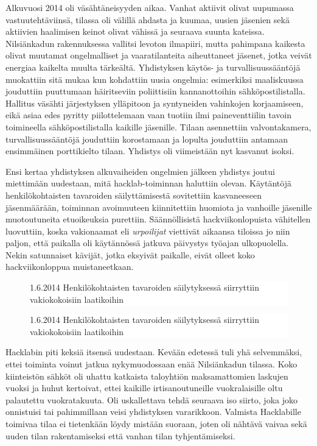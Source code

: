 \documentclass[a4paper]{memoir}
\newcommand{\varitys}{white}
\newlength{\aXa}
\newlength{\aXb}
\newcommand{\jana}[1]{
        \setlength{\aXa}{4cm}
        \setlength{\aXb}{0.4\textwidth}
   \ifodd\value{page}
        \begin{figure}\vspace{-7pt} \hspace{5pt} \colorbox{\varitys}{\parbox{\aXb}{   \textsf{{#1}}  }} \vspace{-7pt}\end{figure}
     \else
        \begin{figure}\vspace{-7pt}    \hspace{-5pt}  \colorbox{\varitys}{\parbox{\aXb}{   \textsf{{#1}} }} \vspace{-7pt}\end{figure}
     \fi
}
\begin{document}
Alkuvuosi 2014 oli väsähtäneisyyden aikaa. Vanhat aktiivit olivat uupumassa vastuutehtäviinsä, tilassa oli välillä ahdasta ja kuumaa, uusien jäsenien sekä aktiivien haalimisen keinot olivat vähissä ja seuraava suunta kateissa. Nilsiänkadun rakennuksessa vallitsi levoton ilmapiiri, mutta pahimpana kaikesta olivat muutamat ongelmalliset ja vaaratilanteita aiheuttaneet jäsenet, jotka veivät energiaa kaikelta muulta tärkeältä. Yhdistyksen käytös- ja turvallisuussääntöjä muokattiin sitä mukaa kun kohdattiin uusia ongelmia: esimerkiksi maaliskuussa jouduttiin puuttumaan häiritseviin poliittisiin kannanottoihin sähköpostilistalla. Hallitus väsähti järjestyksen ylläpitoon ja syntyneiden vahinkojen korjaamiseen, eikä asiaa edes pyritty piilottelemaan vaan tuotiin ilmi paineventtiilin tavoin toimineella sähköpostilistalla kaikille jäsenille. Tilaan asennettiin valvontakamera, turvallisuussääntöjä jouduttiin korostamaan ja lopulta jouduttiin antamaan ensimmäinen porttikielto tilaan. Yhdistys oli viimeistään nyt kasvanut isoksi.

Ensi kertaa yhdistyksen alkuvaiheiden ongelmien jälkeen yhdistys joutui miettimään uudestaan, mitä hacklab-toiminnan haluttiin olevan. Käytäntöjä henkilökohtaisten tavaroiden säilyttämisestä sovitettiin kasvaneeseen jäsenmäärään, toiminnan avoimuuteen kiinnitettiin huomiota ja vanhoille jäsenille muotoutuneita etuoikeuksia purettiin. Säännöllisistä hackviikonlopuista vähitellen luovuttiin, koska vakionaamat eli \textit{urpoilijat} viettivät aikaansa tiloissa jo niin paljon, että paikalla oli käytännössä jatkuva päivystys työajan ulkopuolella. Nekin satunnaiset kävijät, jotka eksyivät paikalle, eivät olleet koko hackviikonloppua muistaneetkaan.

\jana{1.6.2014 Henkilökohtaisten tavaroiden säilytyksessä siirryttiin vakiokokoisiin laatikoihin}

Hacklabin piti keksiä itsensä uudestaan. Kevään edetessä tuli yhä selvemmäksi, ettei toiminta voinut jatkua nykymuodossaan enää Nilsiänkadun tilassa. Koko kiinteistön sähköt oli uhattu katkaista taloyhtiön maksamattomien laskujen vuoksi ja huhut kertoivat, ettei kaikille irtisanoutuneille vuokralaisille oltu palautettu vuokratakuuta. Oli uskallettava tehdä seuraava iso siirto, joka joko onnistuisi tai pahimmillaan veisi yhdistyksen vararikkoon. Valmista Hacklabille toimivaa tilaa ei tietenkään löydy mistään suoraan, joten oli nähtävä vaivaa sekä uuden tilan rakentamiseksi että vanhan tilan tyhjentämiseksi.
\end{document}
